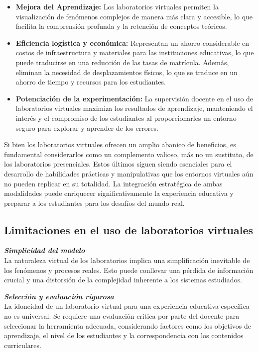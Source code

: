 \begin{itemize}
    \item\textbf{Mejora del Aprendizaje: }Los laboratorios virtuales permiten la visualización de fenómenos complejos de manera más clara y accesible, lo que facilita la comprensión profunda y la retención de conceptos teóricos.
    \item\textbf{Eficiencia logística y económica: }Representan un ahorro considerable en costos de infraestructura y materiales para las instituciones educativas, lo que puede traducirse en una reducción de las tasas de matrícula. Además, eliminan la necesidad de desplazamientos físicos, lo que se traduce en un ahorro de tiempo y recursos para los estudiantes.
    \item\textbf{Potenciación de la experimentación: }La supervisión docente en el uso de laboratorios virtuales maximiza los resultados de aprendizaje, manteniendo el interés y el compromiso de los estudiantes al proporcionarles un entorno seguro para explorar y aprender de los errores.
\end{itemize}

Si bien los laboratorios virtuales ofrecen un amplio abanico de beneficios, es fundamental considerarlos como un complemento valioso, más no un sustituto, de los laboratorios presenciales. Estos últimos siguen siendo esenciales para el desarrollo de habilidades prácticas y manipulativas que los entornos virtuales aún no pueden replicar en su totalidad. La integración estratégica de ambas modalidades puede enriquecer significativamente la experiencia educativa y preparar a los estudiantes para los desafíos del mundo real.
\newpage
\subsection{Limitaciones en el uso de laboratorios virtuales}
\textbf{\textit{Simplicidad del modelo}}\\
La naturaleza virtual de los laboratorios implica una simplificación inevitable de los fenómenos y procesos reales. Esto puede conllevar una pérdida de información crucial y una distorsión de la complejidad inherente a los sistemas estudiados.

\textbf{\textit{Selección y evaluación rigurosa}}\\
La idoneidad de un laboratorio virtual para una experiencia educativa específica no es universal. Se requiere una evaluación crítica por parte del docente para seleccionar la herramienta adecuada, considerando factores como los objetivos de aprendizaje, el nivel de los estudiantes y la correspondencia con los contenidos curriculares.


